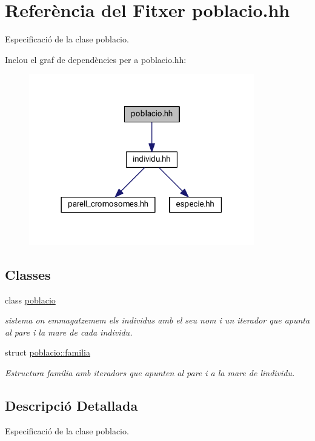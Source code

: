 \hypertarget{poblacio_8hh}{}\section{Referència del Fitxer poblacio.\+hh}
\label{poblacio_8hh}


Especificació de la clase poblacio.  


Inclou el graf de dependències per a poblacio.\+hh\+:
\nopagebreak
\begin{figure}[H]
\begin{center}
\leavevmode
\includegraphics[width=278pt]{poblacio_8hh__incl}
\end{center}
\end{figure}
\subsection*{Classes}
\begin{DoxyCompactItemize}
\item 
class \hyperlink{classpoblacio}{poblacio}
\begin{DoxyCompactList}\small\item\em sistema on emmagatzemem els individus amb el seu nom i un iterador que apunta al pare i la mare de cada individu. \end{DoxyCompactList}\item 
struct \hyperlink{structpoblacio_1_1familia}{poblacio\+::familia}
\begin{DoxyCompactList}\small\item\em Estructura familia amb iteradors que apunten al pare i a la mare de l\textquotesingle{}individu. \end{DoxyCompactList}\end{DoxyCompactItemize}


\subsection{Descripció Detallada}
Especificació de la clase poblacio. 

